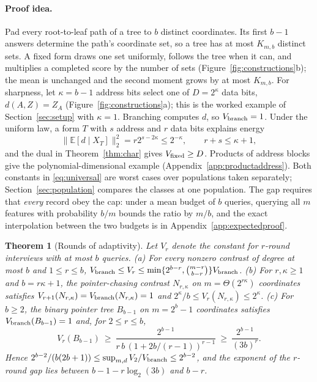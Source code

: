 \documentclass{article}
\newtheorem{theorem}{Theorem}
\newcommand{\E}{\mathbb{E}}
\begin{document}
\paragraph{Proof idea.}
Pad every root-to-leaf path of a tree to $b$ distinct coordinates. Its first $b-1$ answers determine the path's coordinate set, so a tree has at most $K_{m,b}$ distinct sets. A fixed form draws one set uniformly, follows the tree when it can, and multiplies a completed score by the number of sets (Figure~\ref{fig:constructions}b); the mean is unchanged and the second moment grows by at most $K_{m,b}$. For sharpness, let $\kappa=b-1$ address bits select one of $D=2^\kappa$ data bits, $d(A,Z)=Z_A$ (Figure~\ref{fig:constructions}a); this is the worked example of Section~\ref{sec:setup} with $\kappa=1$. Branching computes $d$, so $V_{\rm branch}=1$. Under the uniform law, a form $T$ with $s$ address and $r$ data bits explains energy
\begin{equation}
 \|\E[d\mid X_T]\|_2^2=r2^{s-2\kappa}\le2^{-\kappa},\qquad r+s\le\kappa+1,\label{eq:addressinformation}
\end{equation}
and the dual in Theorem~\ref{thm:char} gives $V_{\rm fixed}\ge D$. Products of address blocks give the polynomial-dimensional example (Appendix~\ref{app:productaddress}). Both constants in \eqref{eq:universal} are worst cases over populations taken separately; Section~\ref{sec:population} compares the classes at one population. The gap requires that \emph{every} record obey the cap: under a mean budget of $b$ queries, querying all $m$ features with probability $b/m$ bounds the ratio by $m/b$, and the exact interpolation between the two budgets is in Appendix~\ref{app:expectedproof}.

\begin{theorem}[Rounds of adaptivity]\label{thm:rounds}
Let $V_r$ denote the constant for $r$-round interviews with at most $b$ queries.
\textup{(a)} For every nonzero contrast of degree at most $b$ and $1\le r\le b$,
$V_{\rm branch}\le V_r\le\min\{2^{b-r},\binom{m-r}{b-r}\}V_{\rm branch}$.
\textup{(b)} For $r,\kappa\ge1$ and $b=r\kappa+1$, the pointer-chasing contrast $N_{r,\kappa}$ on $m=\Theta(2^{r\kappa})$ coordinates satisfies $V_{r+1}(N_{r,\kappa})=V_{\rm branch}(N_{r,\kappa})=1$ and $2^\kappa/b\le V_r(N_{r,\kappa})\le2^\kappa$.
\textup{(c)} For $b\ge2$, the binary pointer tree $B_{b-1}$ on $m=2^b-1$ coordinates satisfies $V_{\rm branch}(B_{b-1})=1$ and, for $2\le r\le b$,
\[
 V_r(B_{b-1})\ \ge\ \frac{2^{b-1}}{r\,b\,(1+2b/(r-1))^{r-1}}\ \ge\ \frac{2^{b-1}}{(3b)^r}.
\]
Hence $2^{b-2}/(b(2b+1))\le\sup_{m,d}V_2/V_{\rm branch}\le2^{b-2}$, and the exponent of the $r$-round gap lies between $b-1-r\log_2(3b)$ and $b-r$.
\end{theorem}
\end{document}
